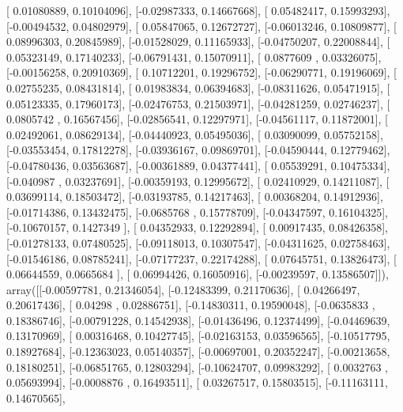 \documentclass{article}
\begin{document}
       [ 0.01080889,  0.10104096],
       [-0.02987333,  0.14667668],
       [ 0.05482417,  0.15993293],
       [-0.00494532,  0.04802979],
       [ 0.05847065,  0.12672727],
       [-0.06013246,  0.10809877],
       [ 0.08996303,  0.20845989],
       [-0.01528029,  0.11165933],
       [-0.04750207,  0.22008844],
       [ 0.05323149,  0.17140233],
       [-0.06791431,  0.15070911],
       [ 0.0877609 ,  0.03326075],
       [-0.00156258,  0.20910369],
       [ 0.10712201,  0.19296752],
       [-0.06290771,  0.19196069],
       [ 0.02755235,  0.08431814],
       [ 0.01983834,  0.06394683],
       [-0.08311626,  0.05471915],
       [ 0.05123335,  0.17960173],
       [-0.02476753,  0.21503971],
       [-0.04281259,  0.02746237],
       [ 0.0805742 ,  0.16567456],
       [-0.02856541,  0.12297971],
       [-0.04561117,  0.11872001],
       [ 0.02492061,  0.08629134],
       [-0.04440923,  0.05495036],
       [ 0.03090099,  0.05752158],
       [-0.03553454,  0.17812278],
       [-0.03936167,  0.09869701],
       [-0.04590444,  0.12779462],
       [-0.04780436,  0.03563687],
       [-0.00361889,  0.04377441],
       [ 0.05539291,  0.10475334],
       [-0.040987  ,  0.03237691],
       [-0.00359193,  0.12995672],
       [ 0.02410929,  0.14211087],
       [ 0.03699114,  0.18503472],
       [-0.03193785,  0.14217463],
       [ 0.00368204,  0.14912936],
       [-0.01714386,  0.13432475],
       [-0.0685768 ,  0.15778709],
       [-0.04347597,  0.16104325],
       [-0.10670157,  0.1427349 ],
       [ 0.04352933,  0.12292894],
       [ 0.00917435,  0.08426358],
       [-0.01278133,  0.07480525],
       [-0.09118013,  0.10307547],
       [-0.04311625,  0.02758463],
       [-0.01546186,  0.08785241],
       [-0.07177237,  0.22174288],
       [ 0.07645751,  0.13826473],
       [ 0.06644559,  0.0665684 ],
       [ 0.06994426,  0.16050916],
       [-0.00239597,  0.13586507]]), array([[-0.00597781,  0.21346054],
       [-0.12483399,  0.21170636],
       [ 0.04266497,  0.20617436],
       [ 0.04298   ,  0.02886751],
       [-0.14830311,  0.19590048],
       [-0.0635833 ,  0.18386746],
       [-0.00791228,  0.14542938],
       [-0.01436496,  0.12374499],
       [-0.04469639,  0.13170969],
       [ 0.00316468,  0.10427745],
       [-0.02163153,  0.03596565],
       [-0.10517795,  0.18927684],
       [-0.12363023,  0.05140357],
       [-0.00697001,  0.20352247],
       [-0.00213658,  0.18180251],
       [-0.06851765,  0.12803294],
       [-0.10624707,  0.09983292],
       [ 0.0032763 ,  0.05693994],
       [-0.0008876 ,  0.16493511],
       [ 0.03267517,  0.15803515],
       [-0.11163111,  0.14670565],
\end{document}

